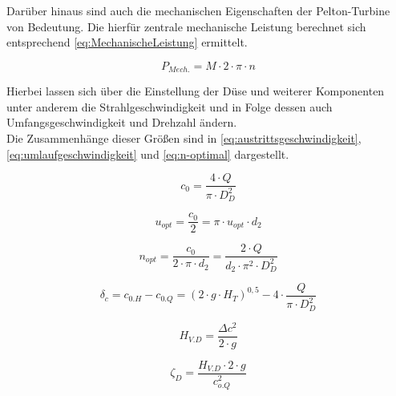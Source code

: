 Darüber hinaus sind auch die mechanischen Eigenschaften der Pelton-Turbine von Bedeutung.
Die hierfür zentrale mechanische Leistung berechnet sich entsprechend \autoref{eq:MechanischeLeistung} ermittelt.

\begin{equation}
	P_{Mech.}= M \cdot 2 \cdot \pi \cdot n
\label{eq:MechanischeLeistung}
\end{equation}

Hierbei lassen sich über die Einstellung der Düse und weiterer Komponenten unter anderem die Strahlgeschwindigkeit
und in Folge dessen auch Umfangsgeschwindigkeit und Drehzahl ändern.\\
Die Zusammenhänge dieser Größen sind in \autoref{eq:austrittsgeschwindigkeit},\autoref{eq:umlaufgeschwindigkeit} und \autoref{eq:n-optimal} dargestellt.

\begin{equation}
    c_{0}=\frac{4 \cdot Q}{\pi \cdot D_{D}^2}
      \label{eq:austrittsgeschwindigkeit}
    \end{equation}

  \begin{equation}
    u_{opt} = \frac{c_{0}}{2}=\pi \cdot u_{opt} \cdot d_{2}
    \label{eq:umlaufgeschwindigkeit}
  \end{equation}
    
    \begin{equation}
     n_{opt}=\frac{c_{0}}{2 \cdot \pi \cdot d_{2}}=\frac{2 \cdot Q}{d_{2} \cdot \pi^2  \cdot D_{D}^2}
    \label{eq:n-optimal}
    \end{equation}


    
    \begin{equation}
        \delta_c = c_{0.H} - c_{0.Q} = ( 2\cdot g \cdot H_T)^{0,5} - 4\cdot \frac{Q}{\pi \cdot D_D^2}
    \end{equation}

    \begin{equation}
        H_{V.D} = \frac{\Delta c^2}{2\cdot g}
    \end{equation}
        
     \begin{equation}
        \zeta_D = \frac{H_{V.D} \cdot 2 \cdot g}{c_{o.Q}^2}
    \end{equation}
